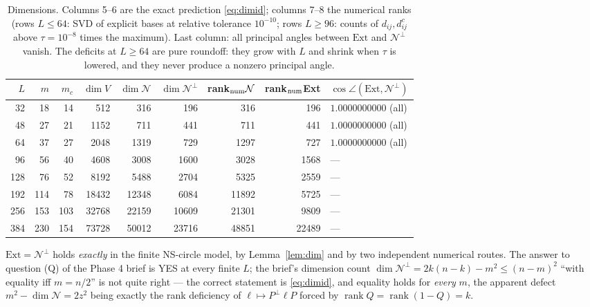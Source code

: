 \documentclass[11pt]{article}
\begin{document}
\begin{table}[htbp]\centering\small
\begin{tabular}{rrrr rr rr l}
\toprule
$L$&$m$&$m_c$&$\dim V$&$\dim\mathcal N$&$\dim\mathcal N^\perp$&rank$_{\rm num}\mathcal N$&rank$_{\rm num}$Ext&$\cos\angle(\mathrm{Ext},\mathcal N^\perp)$\\
\midrule
32&18&14& 512& 316& 196& 316& 196& $1.0000000000$ (all)\\
48&27&21&1152& 711& 441& 711& 441& $1.0000000000$ (all)\\
64&37&27&2048&1319& 729&1297& 727& $1.0000000000$ (all)\\
\midrule
96 & 56& 40& 4608& 3008& 1600&3028&1568&---\\
128& 76& 52& 8192& 5488& 2704&5325&2559&---\\
192&114& 78&18432&12348& 6084&11892&5725&---\\
256&153&103&32768&22159&10609&21301&9809&---\\
384&230&154&73728&50012&23716&48851&22489&---\\
\bottomrule
\end{tabular}
\caption{Dimensions.  Columns 5--6 are the exact prediction \eqref{eq:dimid}; columns 7--8
the numerical ranks (rows $L\le64$: SVD of explicit bases at relative tolerance
$10^{-10}$; rows $L\ge96$: counts of $d_{ij},d^c_{ij}$ above $\tau=10^{-8}$ times the
maximum).  Last column: all principal angles between $\mathrm{Ext}$ and
$\mathcal N^\perp$ vanish.  The deficits at $L\ge64$ are pure roundoff: they grow with
$L$ and shrink when $\tau$ is lowered, and they never produce a nonzero principal angle.}
\label{tab:dim}
\end{table}

\begin{verdictok}
$\mathrm{Ext}=\mathcal N^\perp$ holds \emph{exactly} in the finite NS-circle model, by
Lemma~\ref{lem:dim} and by two independent numerical routes.  The answer to question (Q)
of the Phase 4 brief is YES at every finite $L$; the brief's dimension count
$\dim\mathcal N^\perp=2k(n-k)-m^2\le(n-m)^2$ ``with equality iff $m=n/2$'' is not quite
right --- the correct statement is \eqref{eq:dimid}, and equality holds for \emph{every}
$m$, the apparent defect $m^2-\dim\mathcal N=2z^2$ being exactly the rank deficiency of
$\ell\mapsto P^\perp\ell P$ forced by $\operatorname{rank}Q=\operatorname{rank}(1-Q)=k$.
\end{verdictok}
\end{document}
